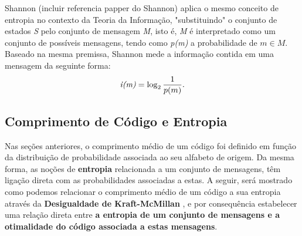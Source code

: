 Shannon (incluir referencia papper do Shannon) aplica o mesmo conceito de entropia no contexto da Teoria da Informação, "substituindo" o conjunto de estados \emph{S} pelo conjunto de mensagem \emph{M}, isto é, \emph{M} é interpretado como um conjunto de possíveis mensagens, tendo como \emph{p(m)} a probabilidade de $m \in M$.
Baseado na mesma premissa, Shannon mede a informação contida em uma mensagem da seguinte forma:
\begin{equation} \label{label:info_quantity}
\emph{i(m)} = \log_2 \frac{1}{p(m)}.
\end{equation}

\subsection{Comprimento de Código e Entropia}
Nas seções anteriores, o comprimento médio de um código  foi definido em função da distribuição de probabilidade associada ao seu alfabeto de origem.
Da mesma forma, as noções de \textbf{entropia} relacionada a um conjunto de mensagens, têm ligação direta com as probabilidades associadas a estas. 
A seguir, será mostrado como podemos relacionar o comprimento médio de um código a sua entropia através da \textbf{Desigualdade de Kraft-McMillan} , e por consequência estabelecer uma relação direta entre \textbf{a entropia de um conjunto de mensagens e a otimalidade do código associada a estas mensagens}.


